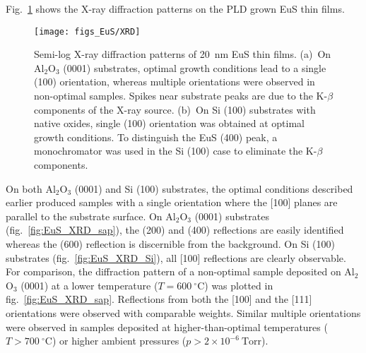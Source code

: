 Fig.~\ref{fig:EuS_XRD} shows the X-ray diffraction patterns on the PLD grown EuS thin films. %
\begin{figure}[ht]%
    \subfloat{\label{fig:EuS_XRD_sap}}%
    \subfloat{\label{fig:EuS_XRD_Si}}%
    \centering%
    \texttt{[image: figs\_EuS/XRD]}%
    \caption[X-ray diffraction patterns of EuS thin films]{\label{fig:EuS_XRD}Semi-log X-ray diffraction patterns of 20~nm EuS thin films. (a)~On Al$_2$O$_3$ (0001) substrates, optimal growth conditions lead to a single (100) orientation, whereas multiple orientations were observed in non-optimal samples. Spikes near substrate peaks are due to the K-$\beta$ components of the X-ray source. (b)~On Si (100) substrates with native oxides, single (100) orientation was obtained at optimal growth conditions. To distinguish the EuS (400) peak, a monochromator was used in the Si (100) case to eliminate the K-$\beta$ components.}%
\end{figure}%
%
On both Al$_2$O$_3$ (0001) and Si (100) substrates, the optimal conditions described earlier produced samples with a single orientation where the [100] planes are parallel to the substrate surface. On Al$_2$O$_3$ (0001) substrates (fig.~\ref{fig:EuS_XRD_sap}), the (200) and (400) reflections are easily identified whereas the (600) reflection is discernible from the background. On Si (100) substrates (fig.~\ref{fig:EuS_XRD_Si}), all [100] reflections are clearly observable. For comparison, the diffraction pattern of a non-optimal sample deposited on Al$_2$O$_3$ (0001) at a lower temperature ($T=600~^{\circ}\mathrm{C}$) was plotted in fig.~\ref{fig:EuS_XRD_sap}. Reflections from both the [100] and the [111] orientations were observed with comparable weights. Similar multiple orientations were observed in samples deposited at higher-than-optimal temperatures ($T>700~^{\circ}\mathrm{C}$) or higher ambient pressures ($p>2\times{}10^{-6}~\mathrm{Torr}$).

